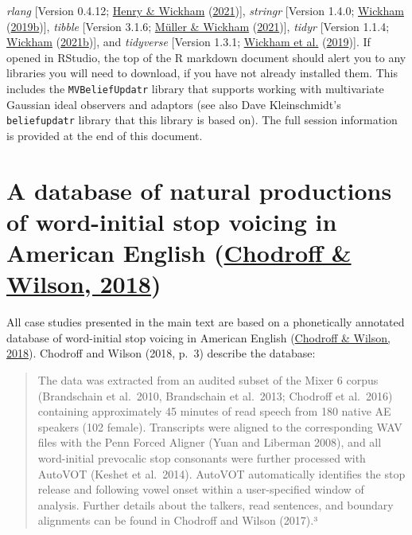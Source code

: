 \documentclass[
  11pt,
  english,
  man,floatsintext]{apa6}
\begin{document}
\emph{rlang} {[}Version 0.4.12; \protect\hyperlink{ref-R-rlang}{Henry \& Wickham} (\protect\hyperlink{ref-R-rlang}{2021}){]}, \emph{stringr} {[}Version 1.4.0; \protect\hyperlink{ref-R-stringr}{Wickham} (\protect\hyperlink{ref-R-stringr}{2019b}){]}, \emph{tibble} {[}Version 3.1.6; \protect\hyperlink{ref-R-tibble}{Müller \& Wickham} (\protect\hyperlink{ref-R-tibble}{2021}){]}, \emph{tidyr} {[}Version 1.1.4; \protect\hyperlink{ref-R-tidyr}{Wickham} (\protect\hyperlink{ref-R-tidyr}{2021b}){]}, and \emph{tidyverse} {[}Version 1.3.1; \protect\hyperlink{ref-R-tidyverse}{Wickham et al.} (\protect\hyperlink{ref-R-tidyverse}{2019}){]}. If opened in RStudio, the top of the R markdown document should alert you to any libraries you will need to download, if you have not already installed them. This includes the \texttt{MVBeliefUpdatr} library that supports working with multivariate Gaussian ideal observers and adaptors (see also Dave Kleinschmidt's \texttt{beliefupdatr} library that this library is based on). The full session information is provided at the end of this document.

\hypertarget{sec:SI-chodroff}{%
\section{\texorpdfstring{A database of natural productions of word-initial stop voicing in American English (\protect\hyperlink{ref-chodroff-wilson2018}{Chodroff \& Wilson, 2018})}{A database of natural productions of word-initial stop voicing in American English (Chodroff \& Wilson, 2018)}}\label{sec:SI-chodroff}}

All case studies presented in the main text are based on a phonetically annotated database of word-initial stop voicing in American English (\protect\hyperlink{ref-chodroff-wilson2018}{Chodroff \& Wilson, 2018}). Chodroff and Wilson (2018, p.~3) describe the database:

\begin{quote}
The data was extracted from an audited subset of the Mixer 6 corpus (Brandschain et al.~2010, Brandschain
et al.~2013; Chodroff et al.~2016) containing approximately 45 minutes of read speech from 180 native AE
speakers (102 female). Transcripts were aligned to the corresponding WAV files with the Penn Forced Aligner
(Yuan and Liberman 2008), and all word-initial prevocalic stop consonants were further processed with
AutoVOT (Keshet et al.~2014). AutoVOT automatically identifies the stop release and following vowel onset
within a user-specified window of analysis. Further details about the talkers, read sentences, and boundary
alignments can be found in Chodroff and Wilson (2017).³
\end{quote}
\end{document}
